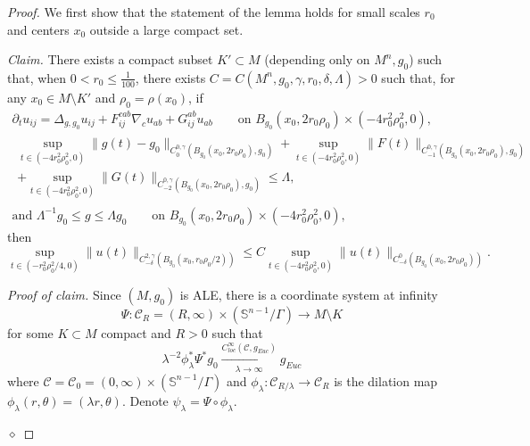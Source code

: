 \documentclass[12pt]{amsart}
\renewcommand{\1}{{\mathbf 1}}
\newenvironment{claim}{\par\medskip\noindent\textit{Claim.}\space}{\par\medskip}
\newenvironment{claimproof}{\par\noindent\textit{Proof of claim.}\space}{\hfill$\diamond$\medskip\par}
\theoremstyle{others}
\numberwithin{equation}{section}
\begin{document}
\begin{proof}
    We first show that the statement of the lemma holds for small scales $r_0$ and centers $x_0$ outside a large compact set.
    \begin{claim} \label{proof parab smoothing in weighted Holder, claim 1}
        There exists a compact subset $K' \subset M$ (depending only on $M^n, g_0$) such that,
        when $0 < r_0 \le \frac1{100}$, there exists $C = C(M^n, g_0, \gamma, r_0, \delta, \Lambda) > 0$ such that, for any $x_0 \in M \setminus K'$ and $\rho_0 = \rho(x_0)$,
        if 
        \begin{gather*}
            \partial_t u_{ij} = \Delta_{g, g_0} u_{ij} + F_{ij}^{cab} \nabla_c u_{ab} + G_{ij}^{ab} u_{ab} \qquad \text{on } B_{g_0}(x_0, 2r_0 \rho_0 ) \times (-4r_0^2\rho_0^2, 0), \\
            \begin{split}
                \sup_{t \in (-4r_0^2\rho_0^2 , 0)} \|  g ( t) - g_0\|_{C^{0, \gamma}_{0}( B_{g_0}( x_0, 2 r_0 \rho_0), g_0 ) }+ \sup_{t \in (-4r_0^2\rho_0^2 , 0)} \|  F ( t)\|_{C^{0, \gamma}_{-1}( B_{g_0}( x_0, 2 r_0 \rho_0) , g_0) } \\+ \sup_{t \in (-4r_0^2\rho_0^2, 0)} \|  G( t) \|_{C^{0, \gamma}_{-2}( B_{g_0}( x_0, 2 r_0 \rho_0) , g_0 ) } 
                \le \Lambda,
            \end{split} \\
            \text{and } \Lambda^{-1} g_0 \le g \le \Lambda g_0 \qquad \text{on } B_{g_0}(x_0, 2r_0 \rho_0 ) \times (-4r_0^2\rho_0^2, 0) ,
        \end{gather*}
        then
        \begin{equation*}
            \sup_{t \in  (-r_0^2 \rho_0^2 /4, 0) } \| u( t) \|_{C^{2, \gamma}_{-\delta}( B_{g_0}(x_0, r_0 \rho_0/2)) } 
            \le C  \sup_{t \in  (-4r_0^2 \rho_0^2, 0) } \| u ( t) \|_{C^0_{-\delta}( B_{g_0}(x_0, 2 r_0 \rho_0) ) }  .
        \end{equation*}
    \end{claim}
    \begin{claimproof}
        Since $(M, g_0)$ is ALE, there is a coordinate system at infinity
            $$\Psi : \mathcal C_R = (R, \infty) \times (\mathbb{S}^{n-1}/ \Gamma) \to M \setminus K $$
        for some $K \subset M$ compact and $R > 0$ 
        such that
        \begin{equation} \label{proof parab smoothing in weighted Holder, eqn 2}
            \lambda^{-2} \phi_{\lambda}^* \Psi^* g_0 \xrightarrow[\lambda \to \infty]{C^\infty_{loc}(\mathcal C, g_{Euc})} g_{Euc}
        \end{equation}
        where $\mathcal C = \mathcal C_0 = (0, \infty) \times ( \mathbb S^{n-1} / \Gamma)$ and $\phi_\lambda : \mathcal C_{R / \lambda} \to \mathcal C_R$ is the dilation map $\phi_\lambda (r, \theta) = (\lambda r, \theta)$.
        Denote $\psi_\lambda = \Psi \circ \phi_\lambda$.
    

\end{claimproof}
\end{proof}
\end{document}
